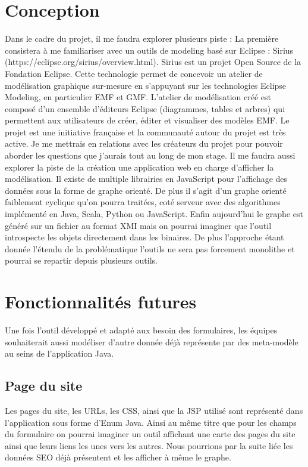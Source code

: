 \section{Conception}
Dans le cadre du projet, il me faudra explorer plusieurs piste :
La première consistera à me familiariser avec un outils de modeling basé sur Eclipse : Sirius (https://eclipse.org/sirius/overview.html). Sirius est un projet Open Source de la Fondation Eclipse. Cette technologie permet de concevoir un atelier de modélisation graphique sur-mesure en s'appuyant sur les technologies Eclipse Modeling, en particulier EMF et GMF. L'atelier de modélisation créé est composé d'un ensemble d'éditeurs Eclipse (diagrammes, tables et arbres) qui permettent aux utilisateurs de créer, éditer et visualiser des modèles EMF. Le projet est une initiative française et la communauté autour du projet est très active. Je me mettrais en relations avec les créateurs du projet pour pouvoir aborder les questions que j’aurais tout au long de mon stage.
Il me faudra aussi explorer la piste de la création une application web en charge d’afficher la modélisation. Il existe de multiple librairies en JavaScript pour l’affichage des données sous la forme de graphe orienté. De plus il s'agit d'un graphe orienté faiblement cyclique qu'on pourra traitées, coté serveur avec des algorithmes implémenté en Java, Scala, Python ou JavaScript. Enfin aujourd’hui le graphe est généré sur un fichier au format XMI mais on pourrai imaginer que l’outil introspecte les objets directement dans les binaires. De plus l'approche étant donnée l'étendu de la problématique l'outils ne sera pas forcement monolithe et pourrai se repartir depuis plusieurs outils.

\section{Fonctionnalités futures}
Une fois l’outil développé et adapté aux besoin des formulaires, les équipes souhaiterait aussi modéliser d'autre donnée déjà représente par des meta-modèle au seins de l'application Java.

\subsection{Page du site}
Les pages du site, les URLs, les CSS, ainsi que la JSP utilisé sont représenté dans l'application sous forme d'Enum Java. Ainsi au même titre que pour les champs du formulaire on pourrai imaginer un outil affichant une carte des pages du site ainsi que leurs liens les unes vers les autres. Nous pourrions par la suite liée les données SEO déjà présentent et les afficher à même le graphe.

